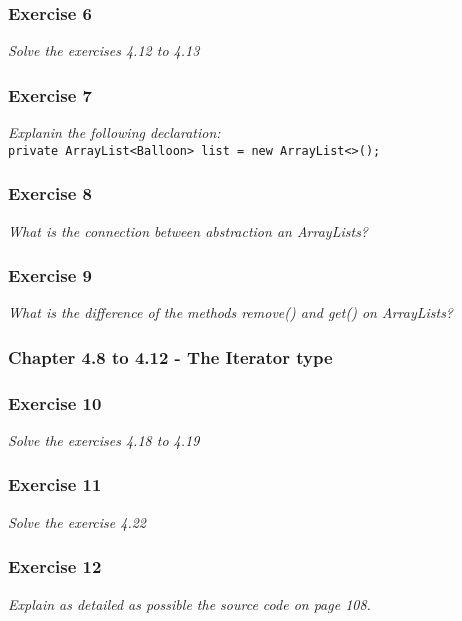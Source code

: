 \subsubsection*{Exercise 6}
\textit{Solve the exercises 4.12 to 4.13}\\

\subsubsection*{Exercise 7}
\textit{Explanin the following declaration:}\\
\lstinline?private ArrayList<Balloon> list = new ArrayList<>();?\\

\subsubsection*{Exercise 8}
\textit{What is the connection between abstraction an ArrayLists?}\\

\subsubsection*{Exercise 9}
\textit{What is the difference of the methods remove() and get() on
ArrayLists?}\\

\subsubsection{Chapter 4.8 to 4.12 - The Iterator type}

\subsubsection*{Exercise 10}
\textit{Solve the exercises 4.18 to 4.19}\\

\subsubsection*{Exercise 11}
\textit{Solve the exercise 4.22}\\

\subsubsection*{Exercise 12}
\textit{Explain as detailed as possible the source code on page 108.}\\


